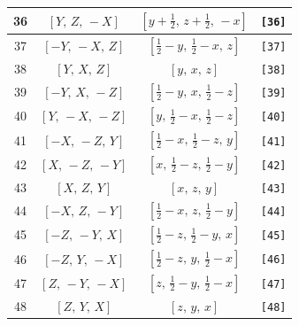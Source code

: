\documentclass[fleqn,8pt]{jsarticle}
\begin{document}
\begin{longtable}{cccc}
36 & $\left[ Y,\, Z,\, - X \right]$ & $\left[ y + \frac{1}{2},\, z + \frac{1}{2},\, - x \right]$ & {\tt [36]} \\ \hline
37 & $\left[ - Y,\, - X,\, Z \right]$ & $\left[ \frac{1}{2} - y,\, \frac{1}{2} - x,\, z \right]$ & {\tt [37]} \\ \hline
38 & $\left[ Y,\, X,\, Z \right]$ & $\left[ y,\, x,\, z \right]$ & {\tt [38]} \\ \hline
39 & $\left[ - Y,\, X,\, - Z \right]$ & $\left[ \frac{1}{2} - y,\, x,\, \frac{1}{2} - z \right]$ & {\tt [39]} \\ \hline
40 & $\left[ Y,\, - X,\, - Z \right]$ & $\left[ y,\, \frac{1}{2} - x,\, \frac{1}{2} - z \right]$ & {\tt [40]} \\ \hline
41 & $\left[ - X,\, - Z,\, Y \right]$ & $\left[ \frac{1}{2} - x,\, \frac{1}{2} - z,\, y \right]$ & {\tt [41]} \\ \hline
42 & $\left[ X,\, - Z,\, - Y \right]$ & $\left[ x,\, \frac{1}{2} - z,\, \frac{1}{2} - y \right]$ & {\tt [42]} \\ \hline
43 & $\left[ X,\, Z,\, Y \right]$ & $\left[ x,\, z,\, y \right]$ & {\tt [43]} \\ \hline
44 & $\left[ - X,\, Z,\, - Y \right]$ & $\left[ \frac{1}{2} - x,\, z,\, \frac{1}{2} - y \right]$ & {\tt [44]} \\ \hline
45 & $\left[ - Z,\, - Y,\, X \right]$ & $\left[ \frac{1}{2} - z,\, \frac{1}{2} - y,\, x \right]$ & {\tt [45]} \\ \hline
46 & $\left[ - Z,\, Y,\, - X \right]$ & $\left[ \frac{1}{2} - z,\, y,\, \frac{1}{2} - x \right]$ & {\tt [46]} \\ \hline
47 & $\left[ Z,\, - Y,\, - X \right]$ & $\left[ z,\, \frac{1}{2} - y,\, \frac{1}{2} - x \right]$ & {\tt [47]} \\ \hline
48 & $\left[ Z,\, Y,\, X \right]$ & $\left[ z,\, y,\, x \right]$ & {\tt [48]} \\
\end{longtable}
\end{document}

